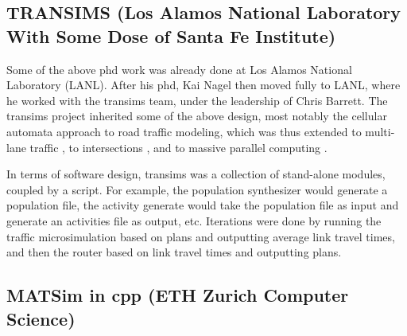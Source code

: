 \subsection{TRANSIMS (Los Alamos National Laboratory With Some Dose of Santa Fe Institute)}
\label{sec:history-lanl-phase}
Some of the above \gls{phd} work was already done at Los Alamos National Laboratory (LANL).  After his \gls{phd}, Kai Nagel then moved fully to LANL, where he worked with the \gls{transims} \citep[e.g.,][]{SmithEtc1995TRANSIMSSeattle} team, under the leadership of Chris Barrett.
%
The \gls{transims} project inherited some of the above design, most notably the cellular automata approach to road traffic modeling, which was thus extended to multi-lane traffic \citep{NagelWolfEtAl1998TwoLaneSystematic}, to intersections \citep{NagelEtc1997flow-char}, and to massive parallel computing \citep{NagelRickert2001parallel}.


In terms of software design, \gls{transims} was a collection of stand-alone modules, coupled by a script.  For example, the population synthesizer would generate a population file, the activity generate would take the population file as input and generate an activities file as output, etc.  Iterations were done by running 
the traffic \gls{microsimulation} 
based on plans and outputting average link travel times, and then the router based on link travel times and outputting plans.

\subsection{MATSim in \protect\gls{cpp} (ETH Zurich Computer Science)}
\label{sec:history-ethz-phase}


